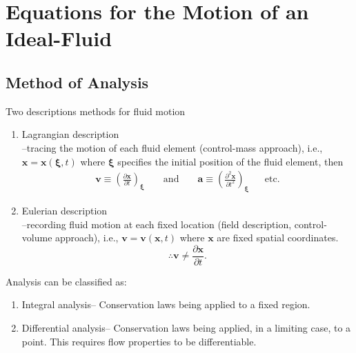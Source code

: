 \chapter{Equations for the Motion of an Ideal-Fluid}
\section{Method of Analysis}
Two descriptions methods for fluid motion
\begin{enumerate}[label = (\arabic*)]
\item Lagrangian description\\
--tracing the motion of each fluid element (control-mass approach), i.e., $\mathbf{x} = \mathbf{x}(\boldsymbol{\xi},t)$ where $\boldsymbol{\xi}$ specifies the initial position of the fluid element, then
\begin{align*}
\mathbf{v}\equiv\left(\frac{\partial\mathbf{x}}{\partial t}\right)_{\boldsymbol{\xi}}&&\text{ and }&&\mathbf{a}\equiv\left(\frac{\partial^2\mathbf{x}}{\partial t^2}\right)_{\boldsymbol{\xi}}&&\text{etc.}
\end{align*}
\item Eulerian description \\
--recording fluid motion at each fixed location (field description, control-volume approach), i.e., $\mathbf{v} = \mathbf{v}(\mathbf{x},t)$ where $\mathbf{x}$ are fixed spatial coordinates.
\[
\therefore\mathbf{v}\neq \frac{\partial\mathbf{x}}{\partial t}.
\]
\end{enumerate}
Analysis can be classified as:
\begin{enumerate}[label = \protect\circled{\arabic*}]
\item Integral analysis-- Conservation laws being applied to a fixed region.
\item Differential analysis-- Conservation laws being applied, in a limiting case, to a point. This requires flow properties to be differentiable. 
\end{enumerate}

